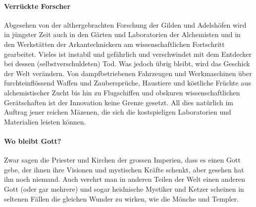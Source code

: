 \documentclass[10pt,twoside,twocolumn,openany]{book}
\begin{document}
\begin{multicols}{2}
	
	\paragraph{Verrückte Forscher}
	Abgesehen von der althergebrachten Forschung der Gilden und Adelshöfen wird in jüngster Zeit auch in den Gärten und Laboratorien der Alchemisten und in den Werkstätten der Arkantechnickern am wissenschaftlichen Fortschritt gearbeitet. Vieles ist instabil und gefährlich und verschwindet mit dem Entdecker bei dessen (selbstverschuldeten) Tod. Was jedoch übrig bleibt, wird das Geschick der Welt verändern. Von dampfbetriebenen Fahrzeugen und Werkmaschinen über furchteinflössend Waffen und Zaubersprüche, Haustiere und köstliche Früchte aus alchemistischer Zucht bis hin zu Flugschiffen und obskuren wissenschaftlichen Gerätschaften ist der Innovation keine Grenze gesetzt. All dies natürlich im Auftrag jener reichen Mäzenen, die sich die kostspieligen Laboratorien und Materialien leisten können.
	
	\paragraph{Wo bleibt Gott?}
	Zwar sagen die Priester und Kirchen der grossen Imperien, dass es einen Gott gebe, der ihnen ihre Visionen und mystischen Kräfte schenkt, aber gesehen hat ihn noch niemand. Auch verehrt man in anderen Teilen der Welt einen anderen Gott (oder gar mehrere) und sogar heidnische Mystiker und Ketzer scheinen in seltenen Fällen die gleichen Wunder zu wirken, wie die Mönche und Templer.
\end{multicols}
\end{document}

